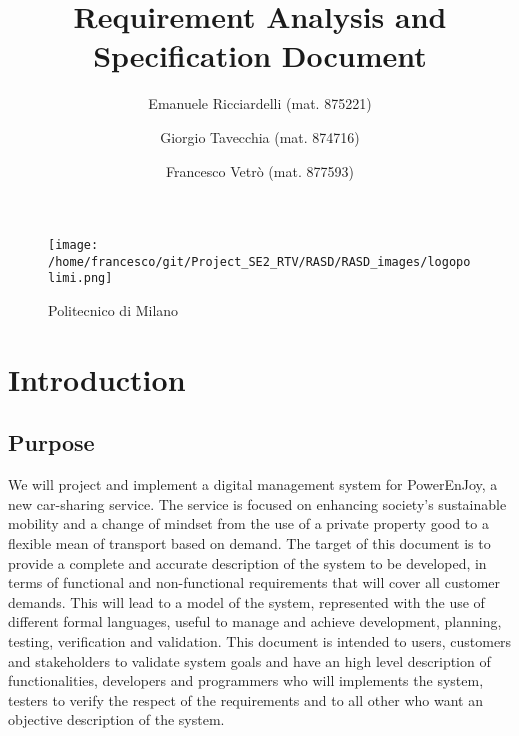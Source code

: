 \documentclass[10pt, a4paper,titlepage]{article}
\begin{document}
\begin{titlepage}
\title{Requirement Analysis and Specification Document}
\author{Emanuele Ricciardelli (mat. 875221) \and Giorgio Tavecchia (mat. 874716) \and Francesco Vetrò (mat. 877593)}
\begin{figure}
\texttt{[image: /home/francesco/git/Project\_SE2\_RTV/RASD/RASD\_images/logopolimi.png]}
\caption{Politecnico di Milano}
\label{fig:logo}
\end{figure}
\maketitle
\end{titlepage}
\tableofcontents
\pagebreak
\section{Introduction}
\subsection{Purpose}
We will project and implement a digital management system for PowerEnJoy, a new car-sharing service. The service is focused on enhancing society's sustainable mobility and a change of mindset from the use of a private property good to a flexible mean of transport based on demand.
The target of this document is to provide a complete and accurate description of the system to be developed, in terms of functional and non-functional requirements that will cover all customer demands. This will lead to a model of the system, represented with the use of different formal languages, useful to manage and achieve development, planning, testing, verification and validation.
This document is intended to users, customers and stakeholders to validate system goals and have an high level description of functionalities, developers and programmers who will implements the system, testers to verify the respect of the requirements and to all other who want an objective description of the system.
\end{document}
